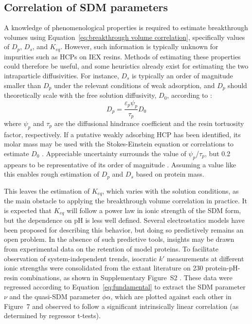\documentclass[preprint,review,12pt]{elsarticle}
\providecommand{\DIFaddtex}[1]{{\protect\color{blue}\uwave{#1}}} %
\providecommand{\DIFaddbegin}{} %
\providecommand{\DIFaddend}{} %
\providecommand{\DIFadd}[1]{\texorpdfstring{\DIFaddtex{#1}}{#1}} %
\begin{document}
    \subsection{Correlation of SDM parameters} \label{ssec:thermo corr}

        A knowledge of phenomenological properties is required to estimate breakthrough volumes using Equation~\ref{eq:breakthrough volume correlation}, specifically values of $D_p$, $D_s$, and $K_{eq}$. However, such information is typically unknown for impurities such as HCPs on IEX resins. Methods of estimating these properties could therefore be useful, and some heuristics already exist for estimating the two intraparticle diffusivities. For instance, $D_s$ is typically an order of magnitude smaller than $D_p$ under the relevant conditions of weak adsorption, and $D_p$ should theoretically scale with the free solution diffusivity, $D_0$, according to \cite{Carta2010a}:
        \begin{equation} \label{eq:tortuosity relationship}
            D_p = \frac{\varepsilon_p \psi_p}{\tau_p} D_0
        \end{equation}
        where $\psi_p$ and $\tau_p$ are the diffusional hindrance coefficient and the resin tortuosity factor, respectively. If a putative weakly adsorbing HCP has been identified, its molar mass may be used with the Stokes-Einstein equation or correlations to estimate $D_0$ \cite{Young1980}. Appreciable uncertainty surrounds the value of $\psi_p$/$\tau_p$, but 0.2 appears to be representative of its order of magnitude \cite{Angelo2016b}. Assuming a value like this enables rough estimation of $D_p$ and $D_s$ based on protein mass.



        This leaves the estimation of $K_{eq}$, which varies with the solution conditions, as the main obstacle to applying the breakthrough volume correlation in practice. It is expected that $K_{eq}$ will follow a power law in ionic strength of the SDM form, but the dependence on pH is less well defined. Several electrostatics models have been proposed for describing this behavior, but doing so predictively remains an open problem. In the absence of such predictive tools, insights may be drawn from experimental data on the retention of model proteins. To facilitate observation of system-independent trends, isocratic $k'$ measurements at different ionic strengths were consolidated from the extant literature on 230 protein-pH-resin combinations, as shown in Supplementary Figure~S2 \DIFaddbegin \DIFadd{and the accompanying spreadsheet }\DIFaddend \cite{Staby2000, Staby2001, Staby2004, Staby2005, Staby2006, Staby2007, DePhillips2001, DePhillips2004, Kumar2015, bai1999}. These data were regressed according to Equation~\ref{eq:fundamental} to extract the SDM parameter $\nu$ and the quasi-SDM parameter $\phi \alpha$, which are plotted against each other in Figure~7 and observed to follow a significant intrinsically linear correlation (as determined by regressor t-tests).
\end{document}
